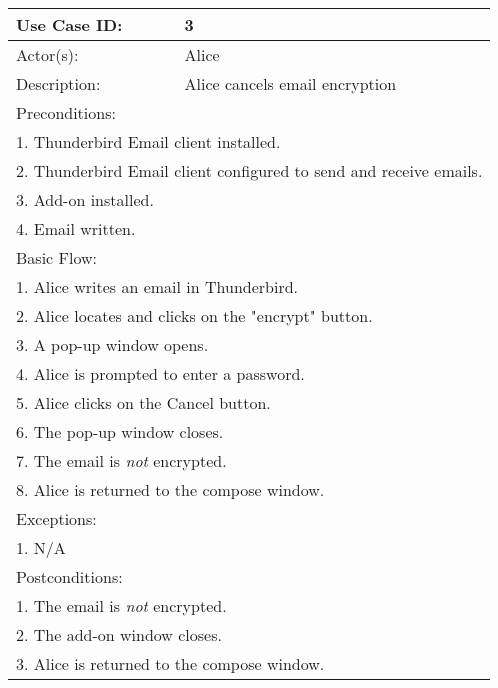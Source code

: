 \begin{longtable} {|p{3cm}|p{9cm}|} %
	\hline
Use Case ID: & 3\\
	\hline
Actor(s): & Alice \\
	\hline
Description: & Alice cancels email encryption \\
	\hline
	\multicolumn{2}{|l|}{Preconditions:} \\
	\multicolumn{2}{|l|}{1. Thunderbird Email client installed.} \\
	\multicolumn{2}{|l|}{2. Thunderbird Email client configured to send and receive emails.}\\
	\multicolumn{2}{|l|}{3. Add-on installed.} \\
	\multicolumn{2}{|l|}{4. Email written.} \\
	\hline
	\multicolumn{2}{|l|}{Basic Flow:} \\
	\multicolumn{2}{|l|}{1. Alice writes an email in Thunderbird.}\\
	\multicolumn{2}{|l|}{2. Alice locates and clicks on the "encrypt" button.} \\
	\multicolumn{2}{|l|}{3. A pop-up window opens.} \\
	\multicolumn{2}{|l|}{4. Alice is prompted to enter a password.}\\
	\multicolumn{2}{|l|}{5. Alice clicks on the Cancel button.}\\
	\multicolumn{2}{|l|}{6. The pop-up window closes.}\\
	\multicolumn{2}{|l|}{7. The email is \emph{not} encrypted.}\\
	\multicolumn{2}{|l|}{8. Alice is returned to the compose window.}\\
	
	\hline
	\hline
	\multicolumn{2}{|l|}{Exceptions:} \\
	\multicolumn{2}{|l|}{1. N/A} \\
	\hline
	\hline
	\multicolumn{2}{|l|}{Postconditions:} \\
	\multicolumn{2}{|l|}{1. The email is \emph{not} encrypted.} \\
	\multicolumn{2}{|l|}{2. The add-on window closes.} \\
	\multicolumn{2}{|l|}{3. Alice is returned to the compose window.} \\
	\hline
\end{longtable}

